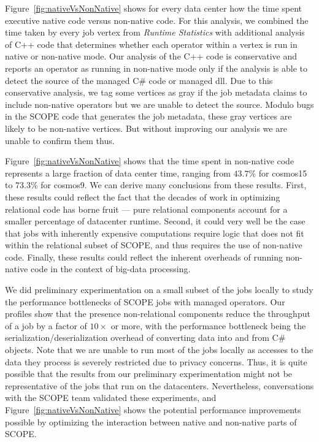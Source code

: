 Figure~\ref{fig:nativeVsNonNative} shows for every data center how the time spent executive native code versus non-native code. 
For this analysis, we combined the time taken by every job vertex from \emph{Runtime Statistics} with additional analysis of C++ code that determines whether each operator within a vertex is run in native or non-native mode. 
Our analysis of the C++ code is conservative and reports an operator as running in non-native mode only if the analysis is able to detect the source of the managed C\# code or managed dll. 
Due to this conservative analysis, we tag some vertices as gray if the job metadata claims to include non-native operators but we are unable to detect the source. 
Modulo bugs in the SCOPE code that generates the job metadata, these gray vertices are likely to be non-native vertices. But without improving our analysis we are unable to confirm them thus. 


Figure~\ref{fig:nativeVsNonNative} shows that the time spent in non-native code represents a large fraction of data center time, ranging from $43.7$\% for cosmos15 to $73.3$\% for cosmos9. 
We can derive many conclusions from these results. First, these results could reflect the fact that the decades of work in optimizing relational code has borne fruit --- pure relational components account for a smaller percentage of datacenter runtime. Second, it could very well be the case that jobs with inherently expensive computations require logic that does not fit within the relational subset of SCOPE, and thus requires the use of non-native code. Finally,
these results could reflect the inherent overheads of running non-native code in the context of big-data processing. 

We did preliminary experimentation on a small subset of the jobs locally to study the performance bottlenecks of SCOPE jobs with managed operators. 
Our profiles show that the presence non-relational components reduce the throughput of a job by a factor of $10\times$ or more, with the performance bottleneck being the serialization/deserialization overhead of converting data into and from C\# objects. Note that we are unable to run most of the jobs locally as accesses to the data they process is severely restricted due to privacy concerns. Thus, it is quite possible that the results from our preliminary experimentation might not be representative of the jobs that run on the datacenters. Nevertheless, conversations with the SCOPE team validated these experiments, and Figure~\ref{fig:nativeVsNonNative} shows the potential performance improvements possible by optimizing the interaction between native and non-native parts of SCOPE. 



